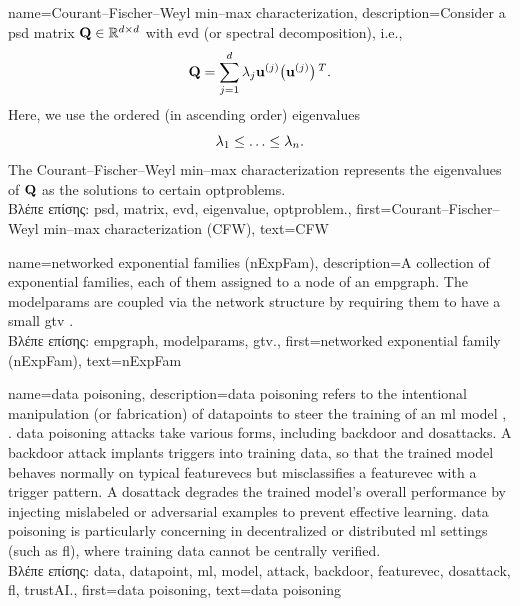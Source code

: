 {name={Courant–Fischer–Weyl min–max characterization}, 
	description={Consider a \gls{psd} 
		\gls{matrix} $\mathbf{Q} \in \mathbb{R}^{d \times d}$ with \gls{evd} (or spectral decomposition), i.e.,
		$$\mathbf{Q} = \sum_{j=1}^{d} \lambda_{j} {\bf u}^{(j)} \big(  {\bf u}^{(j)}  \big)\,^{T}.$$ 
		Here, we use the ordered (in ascending order) \gls{eigenvalue}s 
		\begin{equation}
			\nonumber
			 \lambda_{1}  \leq  \ldots \leq \lambda_{n}. 
		\end{equation}
		The Courant–Fischer–Weyl min–max characterization \cite[Th. 8.1.2]{GolubVanLoanBook} 
		represents the \gls{eigenvalue}s of $\mathbf{Q}$ as the solutions to certain \gls{optproblem}s.\\
		\foreignlanguage{greek}{Βλέπε επίσης:} \gls{psd}, \gls{matrix}, \gls{evd}, \gls{eigenvalue}, \gls{optproblem}.}, 
	first={Courant–Fischer–Weyl min–max characterization (CFW)}, 
	text={CFW}
}

{name={networked exponential families (nExpFam)}, 
	description={A collection of exponential 
		families, each of them assigned to a node of an \gls{empgraph}. The \glspl{modelparam} are coupled 
	   	via the network structure by requiring them to have a small \gls{gtv} \cite{JungNetExp2020}.\\
	   	\foreignlanguage{greek}{Βλέπε επίσης:} \gls{empgraph}, \glspl{modelparam}, \gls{gtv}.},
	  first={networked exponential family (nExpFam)},
	  text={nExpFam}  
}
 
{name={data poisoning}, 
 	description={\Gls{data} poisoning refers to the intentional manipulation 
  		(or fabrication) of \gls{datapoint}s to steer the training of an \gls{ml} \gls{model} \cite{Liu2021}, \cite{PoisonGAN}. 
  		\Gls{data} poisoning \gls{attack}s take various forms, including \gls{backdoor} and \gls{dosattack}s.
  		A \gls{backdoor} \gls{attack} implants triggers into training \gls{data}, so that the trained \gls{model} 
  		behaves normally on typical \gls{featurevec}s but misclassifies a \gls{featurevec} with a trigger pattern.
  		A \gls{dosattack} degrades the trained \gls{model}'s overall performance by injecting mislabeled or 
  		adversarial examples to prevent effective learning.
		\Gls{data} poisoning is particularly concerning in decentralized or distributed \gls{ml} settings (such as \gls{fl}), 
		where training \gls{data} cannot be centrally verified. \\
		\foreignlanguage{greek}{Βλέπε επίσης:} \gls{data}, \gls{datapoint}, \gls{ml}, \gls{model}, \gls{attack}, \gls{backdoor}, 
		\gls{featurevec}, \gls{dosattack}, \gls{fl}, \gls{trustAI}.},
	first={data poisoning},
	text={data poisoning}
}

